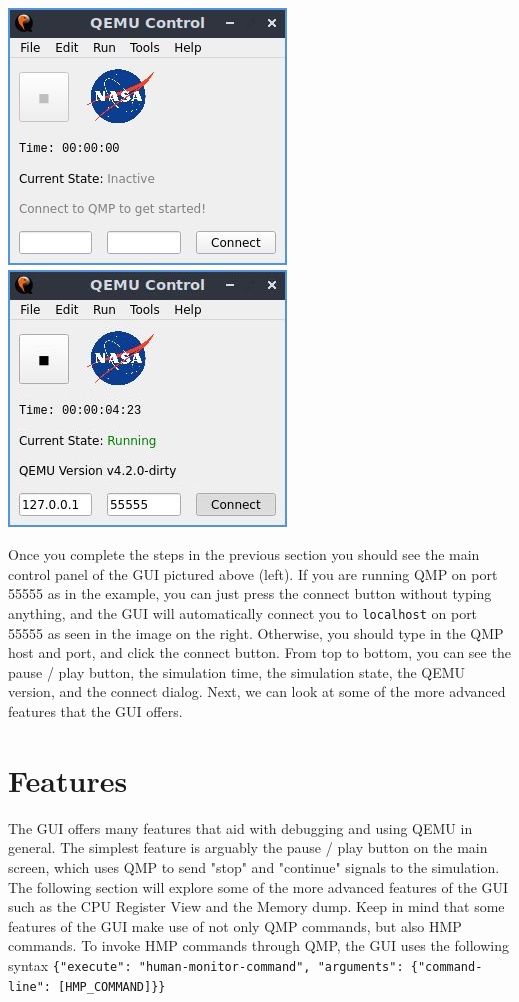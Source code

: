 \documentclass{article}
\newcommand{\code}[1]{\texttt{#1}}
\begin{document}
\begin{center}
    \includegraphics[]{images/main_inactive.jpg}
    \includegraphics[]{images/main_active.jpg}
\end{center}
Once you complete the steps in the previous section you should see the main control panel of the GUI pictured above (left). If you are running QMP on port 55555 as in the example, you can just press the connect button without typing anything, and the GUI will automatically connect you to \code{localhost} on port 55555 as seen in the image on the right. Otherwise, you should type in the QMP host and port, and click the connect button. From top to bottom, you can see the pause / play button, the simulation time, the simulation state, the QEMU version, and the connect dialog. Next, we can look at some of the more advanced features that the GUI offers.

\section{Features}
The GUI offers many features that aid with debugging and using QEMU in general. The simplest feature is arguably the pause / play button on the main screen, which uses QMP to send "stop" and "continue" signals to the simulation. The following section will explore some of the more advanced features of the GUI such as the CPU Register View and the Memory dump. Keep in mind that some features of the GUI make use of not only QMP commands, but also HMP commands. To invoke HMP commands through QMP, the GUI uses the following syntax \code{\{"execute": "human-monitor-command", "arguments": \{"command-line": [HMP\_COMMAND]\}\}}
\end{document}
